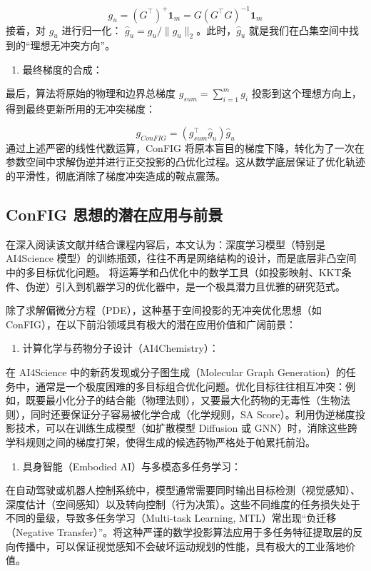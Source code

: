 \documentclass[UTF8,a4paper,12pt,fontset=none]{ctexart}
\begin{document}
\[
g_u = (G^\top)^+ \mathbf{1}_m = G(G^\top G)^{-1} \mathbf{1}_m
\]
接着，对 $g_u$ 进行归一化： $\hat{g}_u = g_u / \|g_u\|_2$。此时，$\hat{g}_u$ 就是我们在凸集空间中找到的“理想无冲突方向”。


\begin{enumerate}
\item 最终梯度的合成：
\end{enumerate}
最后，算法将原始的物理和边界总梯度 $g_{sum} = \sum_{i=1}^m g_i$ 投影到这个理想方向上，得到最终更新所用的无冲突梯度：

\[
g_{ConFIG} = (g_{sum}^\top \hat{g}_u) \hat{g}_u
\]
通过上述严密的线性代数运算，ConFIG 将原本盲目的梯度下降，转化为了一次在参数空间中求解伪逆并进行正交投影的凸优化过程。这从数学底层保证了优化轨迹的平滑性，彻底消除了梯度冲突造成的鞍点震荡。


\subsection{ConFIG 思想的潜在应用与前景}

在深入阅读该文献并结合课程内容后，本文认为：深度学习模型（特别是 AI4Science 模型）的训练瓶颈，往往不再是网络结构的设计，而是底层非凸空间中的多目标优化问题。 将运筹学和凸优化中的数学工具（如投影映射、KKT条件、伪逆）引入到机器学习的优化器中，是一个极具潜力且优雅的研究范式。


除了求解偏微分方程（PDE），这种基于空间投影的无冲突优化思想（如 ConFIG），在以下前沿领域具有极大的潜在应用价值和广阔前景：


\begin{enumerate}
\item 计算化学与药物分子设计（AI4Chemistry）：
\end{enumerate}
    在 AI4Science 中的新药发现或分子图生成（Molecular Graph Generation）的任务中，通常是一个极度困难的多目标组合优化问题。优化目标往往相互冲突：例如，既要最小化分子的结合能（物理法则），又要最大化药物的无毒性（生物法则），同时还要保证分子容易被化学合成（化学规则，SA Score）。利用伪逆梯度投影技术，可以在训练生成模型（如扩散模型 Diffusion 或 GNN）时，消除这些跨学科规则之间的梯度打架，使得生成的候选药物严格处于帕累托前沿。


\begin{enumerate}
\item 具身智能（Embodied AI）与多模态多任务学习：
\end{enumerate}
    在自动驾驶或机器人控制系统中，模型通常需要同时输出目标检测（视觉感知）、深度估计（空间感知）以及转向控制（行为决策）。这些不同维度的任务损失处于不同的量级，导致多任务学习（Multi-task Learning, MTL）常出现“负迁移（Negative Transfer）”。将这种严谨的数学投影算法应用于多任务特征提取层的反向传播中，可以保证视觉感知不会破坏运动规划的性能，具有极大的工业落地价值。
\end{document}
